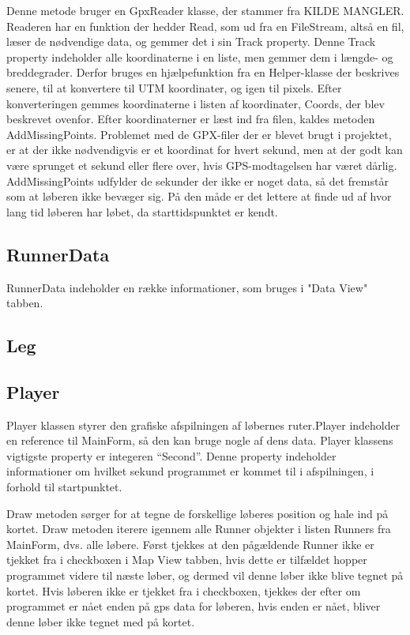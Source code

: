 Denne metode bruger en GpxReader klasse, der stammer fra KILDE MANGLER. Readeren har en funktion der hedder Read, som ud fra en FileStream, altså en fil, læser de nødvendige data, og gemmer det i sin Track property. Denne Track property indeholder alle koordinaterne i en liste, men gemmer dem i længde- og breddegrader. Derfor bruges en hjælpefunktion fra en Helper-klasse der beskrives senere, til at konvertere til UTM koordinater, og igen til pixels. Efter konverteringen gemmes koordinaterne i listen af koordinater, Coords, der blev beskrevet ovenfor. 
Efter koordinaterner er læst ind fra filen, kaldes metoden AddMissingPoints. Problemet med de GPX-filer der er blevet brugt i projektet, er at der ikke nødvendigvis er et koordinat for hvert sekund, men at der godt kan være sprunget et sekund eller flere over, hvis GPS-modtagelsen har været dårlig. AddMissingPoints udfylder de sekunder der ikke er noget data, så det fremstår som at løberen ikke bevæger sig. På den måde er det lettere at finde ud af hvor lang tid løberen har løbet, da starttidspunktet er kendt. 
\subsection{RunnerData}
RunnerData indeholder en række informationer, som bruges i "Data View" tabben.

\subsection{Leg}
\subsection{Player}
Player klassen styrer den grafiske afspilningen af løbernes ruter.Player indeholder en reference til MainForm, så den kan bruge nogle af dens data. \newline
Player klassens vigtigste property er integeren “Second”. Denne property indeholder informationer om hvilket sekund programmet er kommet til i afspilningen, i forhold til startpunktet. 

Draw metoden sørger for at tegne de forskellige løberes position og hale ind på kortet.
Draw metoden iterere igennem alle Runner objekter i listen Runners fra MainForm, dvs. alle løbere.\newline
Først tjekkes at den pågældende Runner ikke er tjekket fra i checkboxen i Map View tabben, hvis dette er tilfældet hopper programmet videre til næste løber, og dermed vil denne løber ikke blive tegnet på kortet. \newline
Hvis løberen ikke er tjekket fra i checkboxen, tjekkes der efter om programmet er nået enden på gps data for løberen, hvis enden er nået, bliver denne løber ikke tegnet med på kortet.

